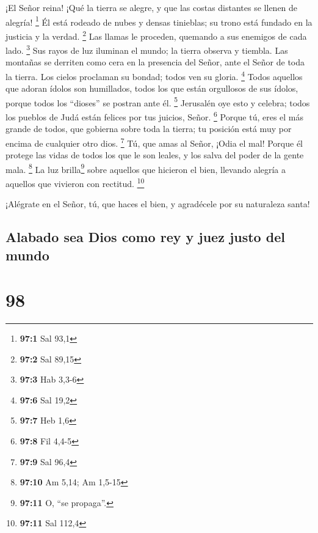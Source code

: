  ¡El Señor reina! ¡Qué la tierra se alegre, y que las
costas distantes se llenen de alegría! \footnote{\textbf{97:1} Sal 93,1}
 Él está rodeado de nubes y densas tinieblas; su trono
está fundado en la justicia y la verdad. \footnote{\textbf{97:2} Sal
  89,15}  Las llamas le proceden, quemando a sus enemigos
de cada lado. \footnote{\textbf{97:3} Hab 3,3-6}  Sus
rayos de luz iluminan el mundo; la tierra observa y tiembla.
 Las montañas se derriten como cera en la presencia del
Señor, ante el Señor de toda la tierra.  Los cielos
proclaman su bondad; todos ven su gloria. \footnote{\textbf{97:6} Sal
  19,2}  Todos aquellos que adoran ídolos son humillados,
todos los que están orgullosos de sus ídolos, porque todos los
``dioses'' se postran ante él. \footnote{\textbf{97:7} Heb 1,6}
 Jerusalén oye esto y celebra; todos los pueblos de Judá
están felices por tus juicios, Señor. \footnote{\textbf{97:8} Fil 4,4-5}
 Porque tú, eres el más grande de todos, que gobierna
sobre toda la tierra; tu posición está muy por encima de cualquier otro
dios. \footnote{\textbf{97:9} Sal 96,4}  Tú, que amas al
Señor, ¡Odia el mal! Porque él protege las vidas de todos los que le son
leales, y los salva del poder de la gente mala. \footnote{\textbf{97:10}
  Am 5,14; Am 1,5-15}  La luz brilla\footnote{\textbf{97:11}
  O, ``se propaga''.} sobre aquellos que hicieron el bien, llevando
alegría a aquellos que vivieron con rectitud. \footnote{\textbf{97:11}
  Sal 112,4}

 ¡Alégrate en el Señor, tú, que haces el bien, y
agradécele por su naturaleza santa!

\hypertarget{alabado-sea-dios-como-rey-y-juez-justo-del-mundo}{%
\subsection{Alabado sea Dios como rey y juez justo del
mundo}\label{alabado-sea-dios-como-rey-y-juez-justo-del-mundo}}

\hypertarget{section-97}{%
\section{98}\label{section-97}}

